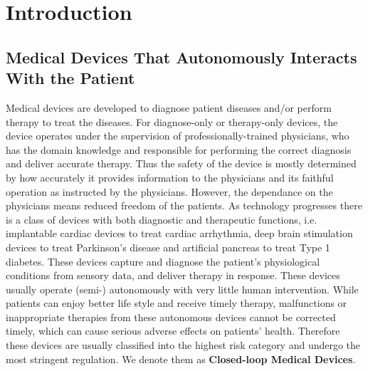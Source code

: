 \section{Introduction}
\subsection{Medical Devices That Autonomously Interacts With the Patient}
Medical devices are developed to diagnose patient diseases and/or perform therapy to treat the diseases. 
For diagnose-only or therapy-only devices, the device operates under the supervision of professionally-trained physicians, who has the domain knowledge and responsible for performing the correct diagnosis and deliver accurate therapy. Thus the safety of the device is mostly determined by how accurately it provides information to the physicians and its faithful operation as instructed by the physicians. 
However, the dependance on the physicians means reduced freedom of the patients. As technology progresses there is a class of devices with both diagnostic and therapeutic functions, i.e. implantable cardiac devices to treat cardiac arrhythmia, deep brain stimulation devices to treat Parkinson's disease and artificial pancreas to treat Type 1 diabetes. These devices capture and diagnose the patient's physiological conditions from sensory data, and deliver therapy in response. These devices usually operate (semi-) autonomously with very little human intervention. While patients can enjoy better life style and receive timely therapy, malfunctions or inappropriate therapies from these autonomous devices cannot be corrected timely, which can cause serious adverse effects on patients' health. Therefore these devices are usually classified into the highest risk category and undergo the most stringent regulation. We denote them as \textbf{Closed-loop Medical Devices}. 
